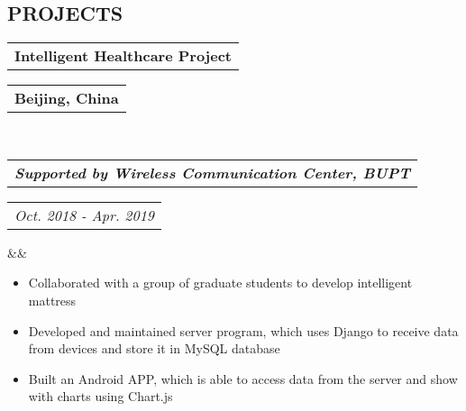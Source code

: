 \documentclass[11pt,a4paper,palatine]{moderncv}        %
\makeatletter
\newcommand*{\customcventry}[7][.25em]{
  \begin{tabular}{@{}l} 
    {\bfseries #4}
  \end{tabular}
  \hfill%
  \begin{tabular}{l@{}}
     {\bfseries #5}
  \end{tabular} \\
  \begin{tabular}{@{}l} 
    {\itshape #3}
  \end{tabular}
  \hfill%
  \begin{tabular}{l@{}}
     {\itshape #2}
  \end{tabular}
  \ifx&#7&%
  \else{\\%
    \begin{minipage}{\maincolumnwidth}%
      \small#7%
    \end{minipage}}\fi%
  \par\addvspace{#1}}
\newcommand*{\customcvproject}[4][.25em]{
  \begin{tabular}{@{}l} 
    {\bfseries #2}
  \end{tabular}
  \hfill%
  \begin{tabular}{l@{}}
     {\itshape #3}
  \end{tabular}
  \ifx&#4&%
  \else{\\%
    \begin{minipage}{\maincolumnwidth}%
      \small#4%
    \end{minipage}}\fi%
  \par\addvspace{#1}}
\makeatother
\begin{document}
\begin{CJK*}{UTF8}{gbsn}
\section{PROJECTS}



{\customcventry{Oct. 2018 - Apr. 2019}{\textbf{Supported by Wireless Communication Center, BUPT}}{Intelligent Healthcare Project}{Beijing, China}{}{}}
  {\begin{itemize}
    \item Collaborated with a group of graduate students to develop intelligent mattress
    \item Developed and maintained server program, which uses Django to receive data from devices and store it in MySQL database
    \item Built an Android APP, which is able to access data from the server and show with charts using Chart.js
  \end{itemize}
}


\end{CJK*}
\end{document}
